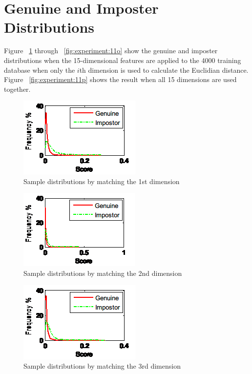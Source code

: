 \section{Genuine and Imposter Distributions}
\label{sec:experiment:distribution}

Figure ~\ref{fig:experiment:11a} through ~\ref{fig:experiment:11o} show the genuine and imposter distributions when the 15-dimensional features are applied to the 4000 training database when only the $i$th dimension is used to calculate the Euclidian distance. Figure ~\ref{fig:experiment:11p} shows the result when all 15 dimensions are used together.

\begin{figure}[htb]
  \begin{center}
    \includegraphics[scale=1]{ch-experiment/figures/11a}
    \caption{Sample distributions by matching the 1st dimension}
    \label{fig:experiment:11a}
  \end{center}
\end{figure}

\begin{figure}[htb]
  \begin{center}
    \includegraphics[scale=1]{ch-experiment/figures/11b}
    \caption{Sample distributions by matching the 2nd dimension}
    \label{fig:experiment:11b}
  \end{center}
\end{figure}

\begin{figure}[htb]
  \begin{center}
    \includegraphics[scale=1]{ch-experiment/figures/11c}
    \caption{Sample distributions by matching the 3rd dimension}
    \label{fig:experiment:11c}
  \end{center}
\end{figure}

